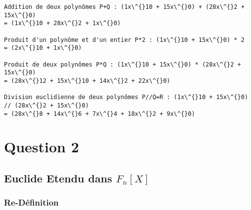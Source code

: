 \documentclass{report}
\newenvironment{code}%
   {\snugshade}%
   {\endsnugshade}
\begin{document}
   \begin{code}\begin{Verbatim}[commandchars=\\\{\}]
Addition de deux polynômes P+Q : (1x\^{}10 + 15x\^{}0) + (28x\^{}2 + 15x\^{}0) 
= (1x\^{}10 + 28x\^{}2 + 1x\^{}0)

Produit d'un polynôme et d'un entier P*2 : (1x\^{}10 + 15x\^{}0) * 2 
= (2x\^{}10 + 1x\^{}0)

Produit de deux polynômes P*Q : (1x\^{}10 + 15x\^{}0) * (28x\^{}2 + 15x\^{}0) 
= (28x\^{}12 + 15x\^{}10 + 14x\^{}2 + 22x\^{}0)

Division euclidienne de deux polynômes P//Q=R : (1x\^{}10 + 15x\^{}0) // (28x\^{}2 + 15x\^{}0) 
= (28x\^{}8 + 14x\^{}6 + 7x\^{}4 + 18x\^{}2 + 9x\^{}0)

    \end{Verbatim}
\end{code}

\section{\texorpdfstring{\textbf{Question
2}}{Question 2}}\label{question-2}

\subsection{\texorpdfstring{\textbf{Euclide Etendu dans
\(F_n[X]\)}}{Euclide Etendu dans F\_n{[}X{]}}}\label{euclide-etendu-dans-f_nx}

\subsubsection{\texorpdfstring{\textbf{Re-Définition}}{Re-Définition}}\label{re-duxe9finition}
\end{document}
